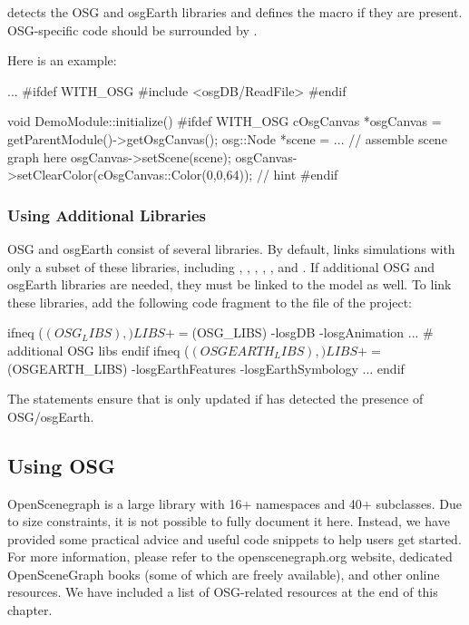 {\opp} detects the OSG and osgEarth libraries and defines the 
macro if they are present. OSG-specific code should be surrounded by
.

Here is an example:

\begin{cpp}
...
#ifdef WITH_OSG
#include <osgDB/ReadFile>
#endif

void DemoModule::initialize()
{
#ifdef WITH_OSG
    cOsgCanvas *osgCanvas = getParentModule()->getOsgCanvas();
    osg::Node *scene = ... // assemble scene graph here
    osgCanvas->setScene(scene);
    osgCanvas->setClearColor(cOsgCanvas::Color(0,0,64)); // hint
#endif
}
\end{cpp}

\subsubsection{Using Additional Libraries}
\label{sec:graphics:using-additional-osg-libraries}

OSG and osgEarth consist of several libraries. By default, {\opp} links
simulations with only a subset of these libraries, including ,
, , , , and
. If additional OSG and osgEarth libraries are needed, they
must be linked to the model as well. To link these libraries, add the following
code fragment to the  file of the project:

\begin{filelisting}
ifneq ($(OSG_LIBS),)
LIBS += $(OSG_LIBS) -losgDB -losgAnimation ... # additional OSG libs
endif
ifneq ($(OSGEARTH_LIBS),)
LIBS += $(OSGEARTH_LIBS) -losgEarthFeatures -losgEarthSymbology ...
endif
\end{filelisting}

The  statements ensure that  is only updated if {\opp}
has detected the presence of OSG/osgEarth.

\subsection{Using OSG}
\label{sec:graphics:using-osg}

OpenScenegraph is a large library with 16+ namespaces and 40+ 
subclasses. Due to size constraints, it is not possible to fully document it
here. Instead, we have provided some practical advice and useful code snippets
to help users get started. For more information, please refer to the
openscenegraph.org website, dedicated OpenSceneGraph books (some of which are
freely available), and other online resources. We have included a list of
OSG-related resources at the end of this chapter.


